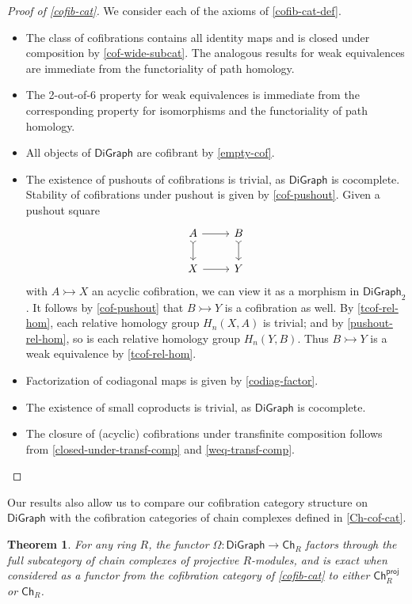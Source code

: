 \documentclass[11pt]{article}
\newtheorem{theorem}[theo]{Theorem}
\theoremstyle{definition}
\numberwithin{equation}{section}
\newcommand{\Ch}{\mathsf{Ch}}
\newcommand{\DiGraph}{\mathsf{DiGraph}}
\newcommand{\Cof}{\mathsf{DiGraph}_2}
\newcommand{\proj}{\mathsf{proj}}
\newcommand{\cto}{\rightarrowtail}
\begin{document}
\begin{proof}[Proof of \cref{cofib-cat}]
We consider each of the axioms of \cref{cofib-cat-def}.
\begin{itemize}
    \item[(C1)] The class of cofibrations contains all identity maps and is closed under composition by \cref{cof-wide-subcat}. 
    The analogous results for weak equivalences are immediate from the functoriality of path homology.
    \item[(C2)] The 2-out-of-6 property for weak equivalences is immediate from the corresponding property for isomorphisms and the functoriality of path homology.
    \item[(C3)] All objects of $\DiGraph$ are cofibrant by \cref{empty-cof}.
    \item[(C4)] The existence of pushouts of cofibrations is trivial, as $\DiGraph$ is cocomplete. 
    Stability of cofibrations under pushout is given by \cref{cof-pushout}.
    Given a pushout square 
    \[
      \begin{tikzcd}
        A \arrow[r] \arrow[d,tail] & B \arrow[d,tail] \\
        X \arrow[r] & Y
      \end{tikzcd}
    \]
    with $A \cto X$ an acyclic cofibration, we can view it as a morphism in $\Cof$.
    It follows by \cref{cof-pushout} that $B \cto Y$ is a cofibration as well.
    By \cref{tcof-rel-hom}, each relative homology group $H_n(X,A)$ is trivial; and by \cref{pushout-rel-hom}, so is each relative homology group $H_n(Y,B)$.
    Thus $B \cto Y$ is a weak equivalence by \cref{tcof-rel-hom}.
    \item[(C5)] Factorization of codiagonal maps is given by \cref{codiag-factor}.
    \item[(C6)] The existence of small coproducts is trivial, as $\DiGraph$ is cocomplete.
    \item[(C7)] The closure of (acyclic) cofibrations under transfinite composition follows from \cref{closed-under-transf-comp} and \cref{weq-transf-comp}. \qedhere
\end{itemize}
\end{proof}

Our results also allow us to compare our cofibration category structure on $\DiGraph$ with the cofibration categories of chain complexes defined in \cref{Ch-cof-cat}.

\begin{theorem}\label{Omega-exact}
For any ring $R$, the functor $\Omega \colon \DiGraph \to \Ch_R$ factors through the full subcategory of chain complexes of projective $R$-modules, and is exact when considered as a functor from the cofibration category of \cref{cofib-cat} to either $\Ch^{\proj}_R$ or $\Ch_R$.
\end{theorem}
\end{document}
